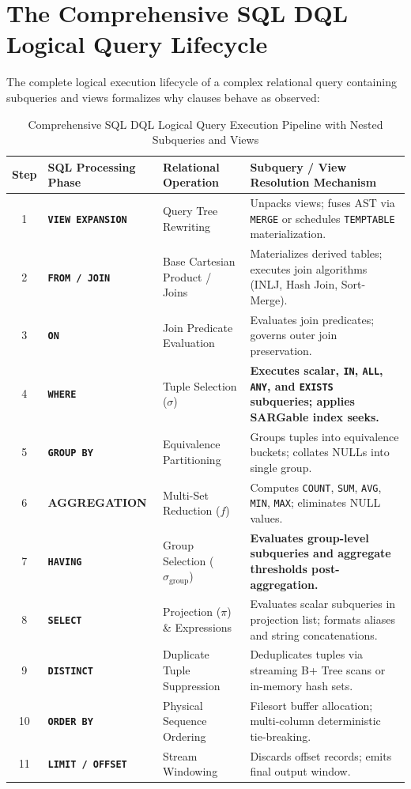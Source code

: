 \documentclass[10pt,twocolumn,letterpaper]{article}
\begin{document}
\section{The Comprehensive SQL DQL Logical Query Lifecycle}
\label{sec:execution_order}

The complete logical execution lifecycle of a complex relational query containing subqueries and views formalizes why clauses behave as observed:

\begin{table}[htbp]
\caption{Comprehensive SQL DQL Logical Query Execution Pipeline with Nested Subqueries and Views}
\label{tab:execution_pipeline}
\centering
\scriptsize
\begin{tabular}{cp{3.2cm}p{3.8cm}p{7.2cm}}
\toprule
\textbf{Step} & \textbf{SQL Processing Phase} & \textbf{Relational Operation} & \textbf{Subquery / View Resolution Mechanism} \\
\midrule
1 & \textbf{\texttt{VIEW EXPANSION}} & Query Tree Rewriting & Unpacks views; fuses AST via \texttt{MERGE} or schedules \texttt{TEMPTABLE} materialization. \\
2 & \textbf{\texttt{FROM / JOIN}} & Base Cartesian Product / Joins & Materializes derived tables; executes join algorithms (INLJ, Hash Join, Sort-Merge). \\
3 & \textbf{\texttt{ON}} & Join Predicate Evaluation & Evaluates join predicates; governs outer join preservation. \\
4 & \textbf{\texttt{WHERE}} & Tuple Selection ($\sigma$) & \textbf{Executes scalar, \texttt{IN}, \texttt{ALL}, \texttt{ANY}, and \texttt{EXISTS} subqueries; applies SARGable index seeks.} \\
5 & \textbf{\texttt{GROUP BY}} & Equivalence Partitioning & Groups tuples into equivalence buckets; collates NULLs into single group. \\
6 & \textbf{AGGREGATION} & Multi-Set Reduction ($f$) & Computes \texttt{COUNT}, \texttt{SUM}, \texttt{AVG}, \texttt{MIN}, \texttt{MAX}; eliminates NULL values. \\
7 & \textbf{\texttt{HAVING}} & Group Selection ($\sigma_{\text{group}}$) & \textbf{Evaluates group-level subqueries and aggregate thresholds post-aggregation.} \\
8 & \textbf{\texttt{SELECT}} & Projection ($\pi$) \& Expressions & Evaluates scalar subqueries in projection list; formats aliases and string concatenations. \\
9 & \textbf{\texttt{DISTINCT}} & Duplicate Tuple Suppression & Deduplicates tuples via streaming B+ Tree scans or in-memory hash sets. \\
10 & \textbf{\texttt{ORDER BY}} & Physical Sequence Ordering & Filesort buffer allocation; multi-column deterministic tie-breaking. \\
11 & \textbf{\texttt{LIMIT / OFFSET}} & Stream Windowing & Discards offset records; emits final output window. \\
\bottomrule
\end{tabular}
\end{table}
\end{document}
